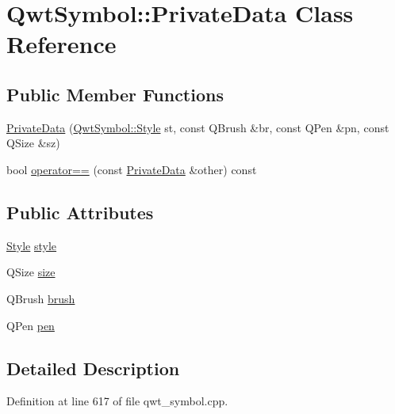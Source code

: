 \hypertarget{class_qwt_symbol_1_1_private_data}{\section{Qwt\-Symbol\-:\-:Private\-Data Class Reference}
\label{class_qwt_symbol_1_1_private_data}
}
\subsection*{Public Member Functions}
\begin{DoxyCompactItemize}
\item 
\hyperlink{class_qwt_symbol_1_1_private_data_a6931fbc77987d1b891a9a52464193128}{Private\-Data} (\hyperlink{class_qwt_symbol_a62f457952470c2076962e83ef2c24d2f}{Qwt\-Symbol\-::\-Style} st, const Q\-Brush \&br, const Q\-Pen \&pn, const Q\-Size \&sz)
\item 
bool \hyperlink{class_qwt_symbol_1_1_private_data_a4900eb56e29d2eabae6459c1ab1c6de4}{operator==} (const \hyperlink{class_qwt_symbol_1_1_private_data}{Private\-Data} \&other) const 
\end{DoxyCompactItemize}
\subsection*{Public Attributes}
\begin{DoxyCompactItemize}
\item 
\hyperlink{class_qwt_symbol_a62f457952470c2076962e83ef2c24d2f}{Style} \hyperlink{class_qwt_symbol_1_1_private_data_ad1bbeea774e4abe80b7e4c7d050da2ff}{style}
\item 
Q\-Size \hyperlink{class_qwt_symbol_1_1_private_data_aba579dda8a092028376bb3aa2baa61c0}{size}
\item 
Q\-Brush \hyperlink{class_qwt_symbol_1_1_private_data_a1fa2f083307d8af8be20946554b48963}{brush}
\item 
Q\-Pen \hyperlink{class_qwt_symbol_1_1_private_data_a29e88fd81f4cc5ccca817c0e98d14725}{pen}
\end{DoxyCompactItemize}


\subsection{Detailed Description}


Definition at line 617 of file qwt\-\_\-symbol.\-cpp.



